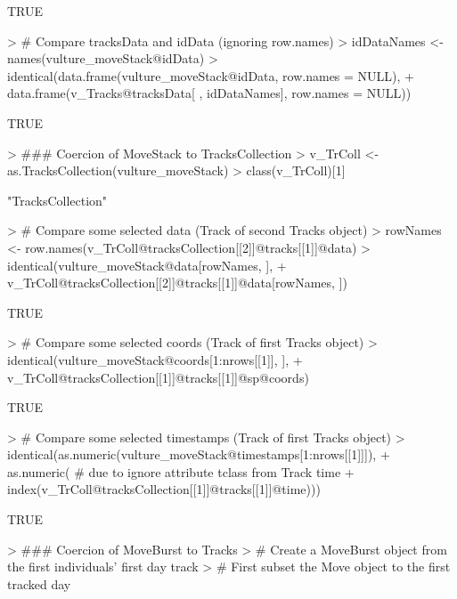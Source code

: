 \documentclass[12pt, oneside, a4paper]{scrbook}
\begin{document}
\begin{small}
\begin{Schunk}
\begin{Sinput}
\end{Sinput}
\begin{Soutput}
[1] TRUE
\end{Soutput}
\begin{Sinput}
> # Compare tracksData and idData (ignoring row.names)
> idDataNames <- names(vulture_moveStack@idData)
> identical(data.frame(vulture_moveStack@idData, row.names = NULL),
+           data.frame(v_Tracks@tracksData[ , idDataNames], row.names = NULL))
\end{Sinput}
\begin{Soutput}
[1] TRUE
\end{Soutput}
\begin{Sinput}
> ### Coercion of MoveStack to TracksCollection
> v_TrColl <- as.TracksCollection(vulture_moveStack)
> class(v_TrColl)[1]
\end{Sinput}
\begin{Soutput}
[1] "TracksCollection"
\end{Soutput}
\begin{Sinput}
> # Compare some selected data (Track of second Tracks object)
> rowNames <- row.names(v_TrColl@tracksCollection[[2]]@tracks[[1]]@data)
> identical(vulture_moveStack@data[rowNames, ],
+           v_TrColl@tracksCollection[[2]]@tracks[[1]]@data[rowNames, ])
\end{Sinput}
\begin{Soutput}
[1] TRUE
\end{Soutput}
\begin{Sinput}
> # Compare some selected coords (Track of first Tracks object)
> identical(vulture_moveStack@coords[1:nrows[[1]], ],
+           v_TrColl@tracksCollection[[1]]@tracks[[1]]@sp@coords)
\end{Sinput}
\begin{Soutput}
[1] TRUE
\end{Soutput}
\begin{Sinput}
> # Compare some selected timestamps (Track of first Tracks object)
> identical(as.numeric(vulture_moveStack@timestamps[1:nrows[[1]]]),
+           as.numeric( # due to ignore attribute tclass from Track time
+             index(v_TrColl@tracksCollection[[1]]@tracks[[1]]@time)))
\end{Sinput}
\begin{Soutput}
[1] TRUE
\end{Soutput}
\begin{Sinput}
> ### Coercion of MoveBurst to Tracks
> # Create a MoveBurst object from the first individuals' first day track
> # First subset the Move object to the first tracked day

\end{Sinput}
\end{Schunk}
\end{small}
\end{document}
